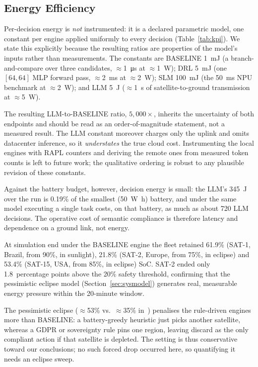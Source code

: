 \documentclass[conference,comsoc,twoside,caption=false]{IEEEtran}
\theoremstyle{definition}
\begin{document}
\subsection{Energy Efficiency}
\label{sec:energy}

Per-decision energy is \emph{not} instrumented: it is a declared parametric
model, one constant per engine applied uniformly to every decision
(Table~\ref{tab:kpi}). We state this explicitly because the resulting ratios
are properties of the model's inputs rather than measurements. The constants
are BASELINE \SI{1}{\milli\joule} (a branch-and-compare over three candidates,
$\approx$\SI{1}{\micro\second} at $\approx$\SI{1}{\watt}); DRL
\SI{5}{\milli\joule} (one $[64,64]$ \ac{MLP} forward pass,
$\approx$\SI{2}{\milli\second} at $\approx$\SI{2}{\watt}); SLM
\SI{100}{\milli\joule} (the \SI{50}{\milli\second} \ac{NPU} benchmark at
$\approx$\SI{2}{\watt}); and LLM \SI{5}{\joule} ($\approx$\SI{1}{\second} of
satellite-to-ground transmission at $\approx$\SI{5}{\watt}).

The resulting LLM-to-BASELINE ratio, $5{,}000\times$, inherits the uncertainty
of both endpoints and should be read as an order-of-magnitude statement, not a
measured result. The LLM constant moreover charges only the uplink and omits
datacenter inference, so it \emph{understates} the true cloud cost.
Instrumenting the local engines with \ac{RAPL} counters and deriving the remote
ones from measured token counts is left to future work; the qualitative
ordering is robust to any plausible revision of these constants.

Against the battery budget, however, decision energy is small: the LLM's
\SI{345}{\joule} over the run is 0.19\% of the smallest (\SI{50}{\watt\hour})
battery, and under the same model executing a single task costs, on that
battery, as much as about 720 LLM decisions. The operative cost of semantic compliance is therefore
latency and dependence on a ground link, not energy.

At simulation end under the BASELINE engine the fleet retained
61.9\% (SAT-1, Brazil, from 90\%, in sunlight), 21.8\% (SAT-2, Europe, from
75\%, in eclipse) and 53.4\% (SAT-15, USA, from 85\%, in eclipse) \ac{SoC}. SAT-2 ended
only 1.8~percentage points above the 20\% safety threshold, confirming that the
pessimistic eclipse model (Section~\ref{sec:sysmodel}) generates real,
measurable energy pressure within the 20-minute window.

The pessimistic eclipse ($\approx$53\% vs.\ $\approx$35\%
in~\cite{sumanth2019}) penalises the rule-driven engines more than BASELINE: a
battery-greedy heuristic just picks another satellite, whereas a GDPR or
sovereignty rule pins one region, leaving discard as the only compliant action if
that satellite is depleted. The setting is thus conservative toward our
conclusions; no such forced drop occurred here, so quantifying it needs an
eclipse sweep.
\end{document}
